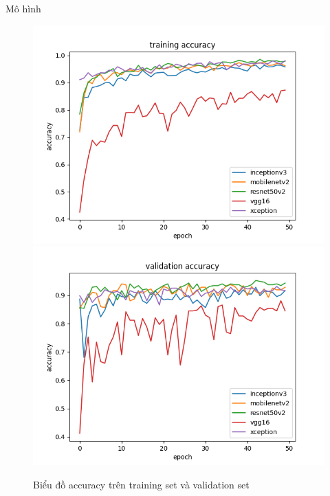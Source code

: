 \documentclass{beamer}
\begin{document}
\begin{frame}[allowframebreaks]{Mô hình}
	\begin{figure}[H]
		\centering
		\includegraphics[scale=0.32]{images/accuracy.png}
		\includegraphics[scale=0.32]{images/val_accuracy.png}
		\caption{Biểu đồ accuracy trên training set và validation set}
	\end{figure}

	\framebreak


\end{frame}
\end{document}
